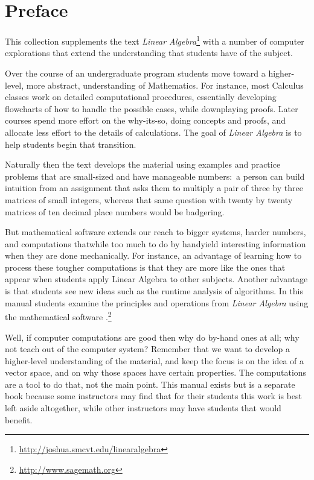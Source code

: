 \chapter*{Preface}\pagestyle{preface}\thispagestyle{preface}


This collection supplements the text
\textit{Linear Algebra}\footnote{\protect\url{http://joshua.smcvt.edu/linearalgebra}}
with a number of computer explorations that extend the understanding that students have
of the subject.

Over the course of an undergraduate program students move toward a higher-level,
more abstract, understanding of Mathematics.
For instance, most Calculus classes work on detailed computational procedures, 
essentially developing flowcharts of how to handle the possible cases,
while downplaying proofs.
Later courses spend more effort on the why-its-so, doing concepts and proofs, and 
allocate less effort to the details of calculations.  
The goal of \textit{Linear Algebra} is to help students begin that transition.

Naturally then the text develops the material using examples and practice problems
that are small-sized and have manageable numbers:~a 
person can build intuition from an assignment 
that asks them to multiply a pair of 
three by three matrices of small integers, whereas that same 
question with twenty by twenty matrices
of ten decimal place numbers would be badgering. 

But mathematical software extends our reach to bigger systems,
harder numbers, and computations that\Dash while too much to do by hand\Dash yield
interesting information when they are done mechanically.
For instance, an advantage of learning how to process these tougher computations is that 
they are more like the ones that appear when students apply Linear 
Algebra to other subjects.
Another advantage is that students see new ideas such as 
the runtime analysis of algorithms.
In this manual students examine the principles and operations 
from \textit{Linear Algebra} using 
the mathematical software \Sage{}.\footnote{\url{http://www.sagemath.org}}

Well, if computer computations are good then why do by-hand ones at all; why not
teach out of the computer system?
Remember that we want to develop a higher-level understanding of the material, and
keep the focus is on the idea of a vector space, and on why those spaces have certain properties.
The computations are a tool to do that, not the main point.
This manual exists but is a separate book because some instructors may find 
that for their students
this work is best left aside altogether, while other instructors may have students that 
would benefit.


